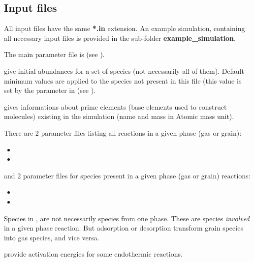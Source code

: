 \documentclass[english,a4paper,twoside]{article}
\begin{document}
\subsection{Input files}
All input files have the same \textbf{*.in} extension. An example simulation, containing all necessary input files is provided in the sub-folder \textbf{example\_simulation}.

The main parameter file is  (see ).

 give initial abundances for a set of species (not necessarily all of them). Default minimum values are applied to the species not present in this file (this value is set by the parameter  in  (see ).

 gives informations about prime elements (base elements used to construct molecules) existing in the simulation (name and mass in Atomic mass unit).

There are 2 parameter files listing all reactions in a given phase (gas or grain): 
\begin{itemize}
\item {}
\item {}
\end{itemize}
and 2 parameter files for species present in a given phase (gas or grain) reactions:
\begin{itemize}
\item {}
\item {}
\end{itemize}

\begin{remarque}
Species in ,  are not necessarily species from one phase. These are species \emph{involved} in a given phase reaction. But adsorption or desorption transform grain species into gas species, and vice versa. 
\end{remarque}

 provide activation energies for some endothermic reactions. 
\end{document}
